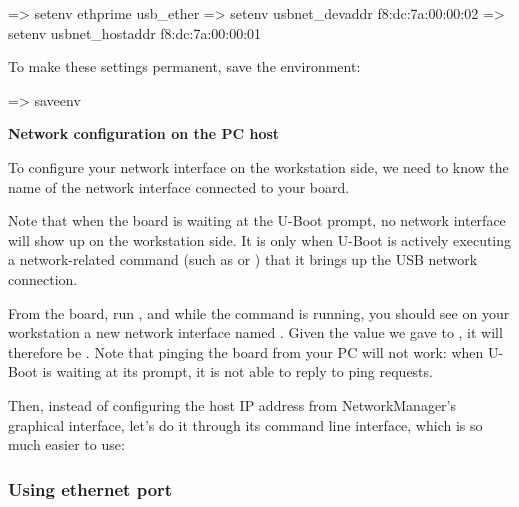 \begin{ubootinput}
=> setenv ethprime usb_ether
=> setenv usbnet_devaddr f8:dc:7a:00:00:02
=> setenv usbnet_hostaddr f8:dc:7a:00:00:01
\end{ubootinput}

To make these settings permanent, save the environment:

\begin{ubootinput}
=> saveenv
\end{ubootinput}





{\bf Network configuration on the PC host}

To configure your network interface on the workstation side, we need
to know the name of the network interface connected to your board.

Note that when the board is waiting at the U-Boot prompt, no network
interface will show up on the workstation side. It is only when U-Boot
is actively executing a network-related command (such as 
or ) that it brings up the USB network connection.

From the board, run , and while the 
command is running, you should see on your workstation a new network
interface named . Given the value we gave to
, it will therefore be
. Note that pinging the board from your PC will
not work: when U-Boot is waiting at its prompt, it is not able to
reply to ping requests.

Then, instead of configuring the host IP address from NetworkManager's
graphical interface, let's do it through its command line interface,
which is so much easier to use:


\subsubsection{Using ethernet port}

